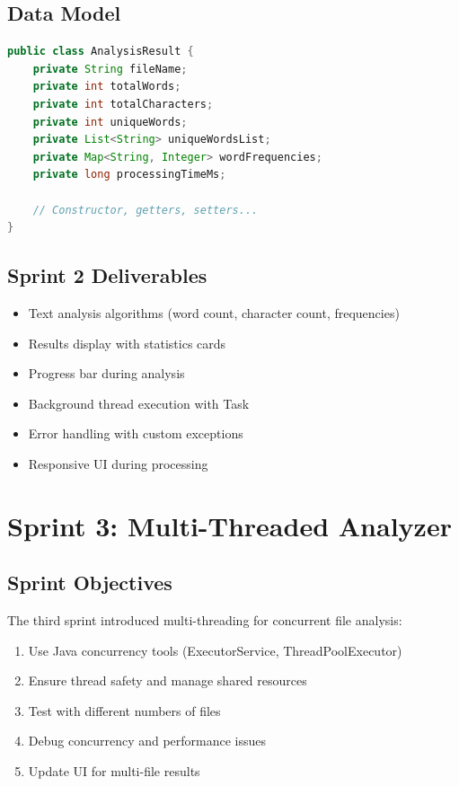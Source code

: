 \documentclass[12pt,a4paper]{report}
\begin{document}
\section{Data Model}
\begin{lstlisting}[language=Java, caption=AnalysisResult Model]
public class AnalysisResult {
    private String fileName;
    private int totalWords;
    private int totalCharacters;
    private int uniqueWords;
    private List<String> uniqueWordsList;
    private Map<String, Integer> wordFrequencies;
    private long processingTimeMs;
    
    // Constructor, getters, setters...
}
\end{lstlisting}

\section{Sprint 2 Deliverables}
\begin{itemize}
    \item[$\checkmark$] Text analysis algorithms (word count, character count, frequencies)
    \item[$\checkmark$] Results display with statistics cards
    \item[$\checkmark$] Progress bar during analysis
    \item[$\checkmark$] Background thread execution with Task
    \item[$\checkmark$] Error handling with custom exceptions
    \item[$\checkmark$] Responsive UI during processing
\end{itemize}

\chapter{Sprint 3: Multi-Threaded Analyzer}

\section{Sprint Objectives}
The third sprint introduced multi-threading for concurrent file analysis:
\begin{enumerate}
    \item Use Java concurrency tools (ExecutorService, ThreadPoolExecutor)
    \item Ensure thread safety and manage shared resources
    \item Test with different numbers of files
    \item Debug concurrency and performance issues
    \item Update UI for multi-file results
\end{enumerate}
\end{document}
